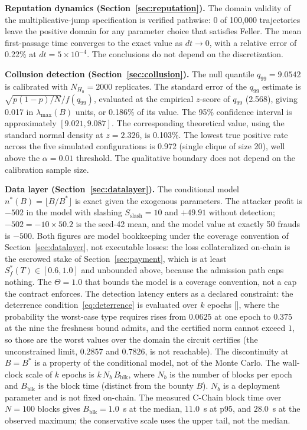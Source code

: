 \documentclass[11pt,a4paper]{article}
\newcommand{\fref}[1]{[\path{#1}]}
\numberwithin{equation}{section}
\numberwithin{table}{section}
\begin{document}
\textbf{Reputation dynamics (Section~\ref{sec:reputation}).} The domain validity of the multiplicative-jump specification is verified pathwise: 0 of 100{,}000 trajectories leave the positive domain for any parameter choice that satisfies Feller. The mean first-passage time converges to the exact value as $dt \to 0$, with a relative error of 0.22\% at $dt = 5 \times 10^{-4}$. The conclusions do not depend on the discretization.

\textbf{Collusion detection (Section~\ref{sec:collusion}).} The null quantile $q_{99} = 9.0542$ is calibrated with $N_{H_0} = 2000$ replicates. The standard error of the $q_{99}$ estimate is $\sqrt{p(1-p)/N} / f(q_{99})$, evaluated at the empirical $z$-score of $q_{99}$ (2.568), giving 0.017 in $\lambda_{\max}(B)$ units, or 0.186\% of its value. The 95\% confidence interval is approximately $[9.021, 9.087]$. The corresponding theoretical value, using the standard normal density at $z = 2.326$, is 0.103\%. The lowest true positive rate across the five simulated configurations is 0.972 (single clique of size 20), well above the $\alpha = 0.01$ threshold. The qualitative boundary does not depend on the calibration sample size.

\textbf{Data layer (Section~\ref{sec:datalayer}).} The conditional model $n^*(B) = \lfloor B/B^* \rfloor$ is exact given the exogenous parameters. The attacker profit is $-502$ in the model with slashing $S_{\mathrm{slash}} = 10$ and $+49.91$ without detection; $-502 = -10 \times 50.2$ is the seed-42 mean, and the model value at exactly 50 frauds is $-500$. Both figures are model bookkeeping under the coverage convention of Section~\ref{sec:datalayer}, not executable losses: the loss collateralized on-chain is the escrowed stake of Section~\ref{sec:payment}, which is at least $S_f^*(T) \in [0.6, 1.0]$ and unbounded above, because the admission path caps nothing. The $\Theta = 1.0$ that bounds the model is a coverage convention, not a cap the contract enforces. The detection latency enters as a declared constraint: the deterrence condition~\eqref{eq:deterrence} is evaluated over $k$ epochs \fref{verification/mechanism/m05_attack_model.py}, where the probability the worst-case type requires rises from $0.0625$ at one epoch to $0.375$ at the nine the freshness bound admits, and the certified norm cannot exceed $1$, so those are the worst values over the domain the circuit certifies (the unconstrained limit, $0.2857$ and $0.7826$, is not reachable). The discontinuity at $B = B^*$ is a property of the conditional model, not of the Monte Carlo. The wall-clock scale of $k$ epochs is $k\,N_b\,B_{\mathrm{blk}}$, where $N_b$ is the number of blocks per epoch and $B_{\mathrm{blk}}$ is the block time (distinct from the bounty $B$). $N_b$ is a deployment parameter and is not fixed on-chain. The measured C-Chain block time over $N = 100$ blocks gives $B_{\mathrm{blk}} = 1.0$~s at the median, $11.0$~s at p95, and $28.0$~s at the observed maximum; the conservative scale uses the upper tail, not the median.
\end{document}
